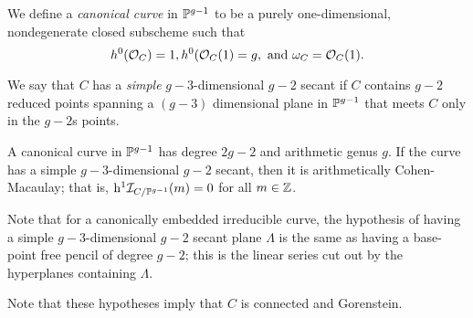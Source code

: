 We define a \emph{canonical curve} in $\PP^{g-1}$ to be a purely one-dimensional, nondegenerate closed subscheme  such that
$$
 h^{0}(\sO_{C}) = 1, h^{0}(\sO_{C}(1) = g, \hbox{ and } \omega_{C} = \sO_{C}(1).
$$

We say that $C$ has a \emph{simple} $g-3$-dimensional $g-2$ secant if $C$ contains $g-2$ reduced points spanning a $(g-3)$ dimensional
plane in $\PP^{g-1}$ that meets $C$ only in the $g-2$s points.

\begin{theorem}
A canonical curve in $\PP^{g-1}$ has degree $2g-2$ and arithmetic genus $g$. If the curve has a simple
$g-3$-dimensional $g-2$ secant, then it is arithmetically Cohen-Macaulay; that is,
$\h^{1}\sI_{C/\PP^{g-1}}(m) = 0$ for all $m\in \ZZ$.
\end{theorem}
 
Note that for a canonically embedded irreducible curve, the hypothesis of having a simple $g-3$-dimensional $g-2$ secant plane $\Lambda$ is the same as having a base-point free pencil of degree $g-2$; this is the linear series 
cut out by the hyperplanes containing $\Lambda$.

 Note that these hypotheses imply that $C$ is connected and Gorenstein.
 
